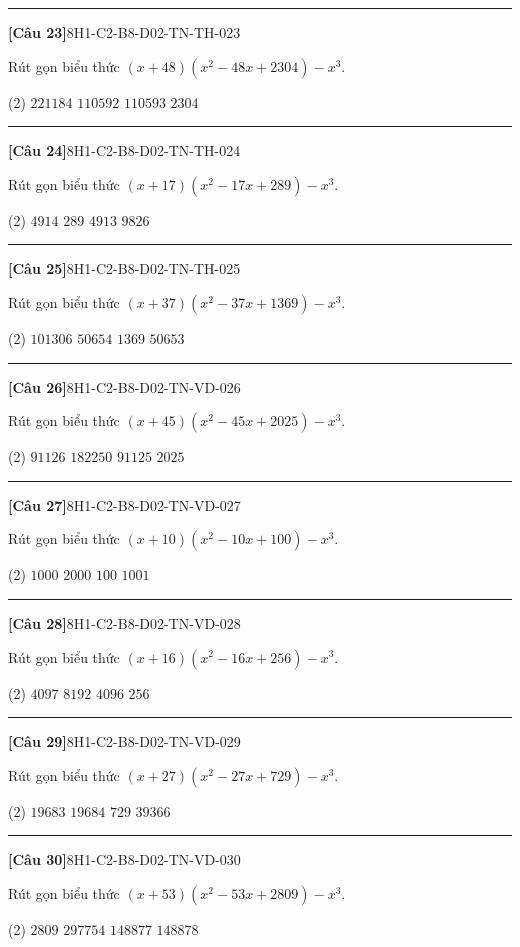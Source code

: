 \documentclass[12pt,a4paper]{article}
\newif\ifloigiai
\newenvironment{cauhoi}[2]{%
  \par\medskip\noindent\rule{\textwidth}{0.4pt}\par\nopagebreak
  \noindent\textbf{[#1]}\hfill{\scriptsize\ttfamily #2}\par\nopagebreak\smallskip}{\par}
\newcommand{\dapan}[1]{\ifloigiai\par\smallskip\noindent\textit{Đáp án:} \textbf{#1}\par\fi}
\begin{document}
\begin{cauhoi}{Câu 23}{8H1-C2-B8-D02-TN-TH-023}
Rút gọn biểu thức $(x+48)(x^{2}-48x+2304)-x^{3}$.
\begin{tasks}(2)
\task $221184$
\task $110592$
\task $110593$
\task $2304$
\end{tasks}
\dapan{B}
\end{cauhoi}
\begin{cauhoi}{Câu 24}{8H1-C2-B8-D02-TN-TH-024}
Rút gọn biểu thức $(x+17)(x^{2}-17x+289)-x^{3}$.
\begin{tasks}(2)
\task $4914$
\task $289$
\task $4913$
\task $9826$
\end{tasks}
\dapan{C}
\end{cauhoi}
\begin{cauhoi}{Câu 25}{8H1-C2-B8-D02-TN-TH-025}
Rút gọn biểu thức $(x+37)(x^{2}-37x+1369)-x^{3}$.
\begin{tasks}(2)
\task $101306$
\task $50654$
\task $1369$
\task $50653$
\end{tasks}
\dapan{D}
\end{cauhoi}
\begin{cauhoi}{Câu 26}{8H1-C2-B8-D02-TN-VD-026}
Rút gọn biểu thức $(x+45)(x^{2}-45x+2025)-x^{3}$.
\begin{tasks}(2)
\task $91126$
\task $182250$
\task $91125$
\task $2025$
\end{tasks}
\dapan{C}
\end{cauhoi}
\begin{cauhoi}{Câu 27}{8H1-C2-B8-D02-TN-VD-027}
Rút gọn biểu thức $(x+10)(x^{2}-10x+100)-x^{3}$.
\begin{tasks}(2)
\task $1000$
\task $2000$
\task $100$
\task $1001$
\end{tasks}
\dapan{A}
\end{cauhoi}
\begin{cauhoi}{Câu 28}{8H1-C2-B8-D02-TN-VD-028}
Rút gọn biểu thức $(x+16)(x^{2}-16x+256)-x^{3}$.
\begin{tasks}(2)
\task $4097$
\task $8192$
\task $4096$
\task $256$
\end{tasks}
\dapan{C}
\end{cauhoi}
\begin{cauhoi}{Câu 29}{8H1-C2-B8-D02-TN-VD-029}
Rút gọn biểu thức $(x+27)(x^{2}-27x+729)-x^{3}$.
\begin{tasks}(2)
\task $19683$
\task $19684$
\task $729$
\task $39366$
\end{tasks}
\dapan{A}
\end{cauhoi}
\begin{cauhoi}{Câu 30}{8H1-C2-B8-D02-TN-VD-030}
Rút gọn biểu thức $(x+53)(x^{2}-53x+2809)-x^{3}$.
\begin{tasks}(2)
\task $2809$
\task $297754$
\task $148877$
\task $148878$
\end{tasks}
\dapan{C}
\end{cauhoi}
\end{document}
